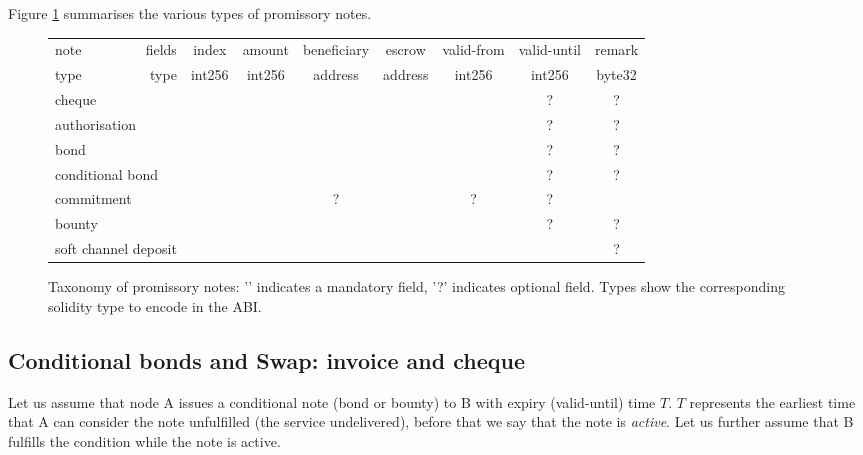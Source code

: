 Figure \ref{fig:taxonomy} summarises the various types of promissory notes.

\newcommand{\tick}{\checkmark}
\newcommand{\opt}{?}
\begin{center}
\begin{figure}
\begin{center}
\begin{tabular}{|l|r||c|c|c|c|c|c|c|}
\hline
note & fields
& index
& amount
& beneficiary
& escrow
& valid-from
& valid-until
& remark
\\
\cline{2-9}

type & type 
& int256
& int256
& address
& address
& int256
& int256
& byte32
\\
\hline
\hline
\multicolumn{2}{|l||}{cheque}   & \tick & \tick & \tick & & & \opt& \opt
\\
\multicolumn{2}{|l||}{authorisation} &  & \tick & \tick & & & \opt& \opt
\\
\multicolumn{2}{|l||}{bond} & \tick & \tick & \tick & & \tick & \opt& \opt
\\
\multicolumn{2}{|l||}{conditional bond} &  & \tick & \tick & \tick & \tick & \opt& \opt
\\
\multicolumn{2}{|l||}{commitment} &   & \tick & \opt &\tick &\opt &\opt& \tick
\\
\multicolumn{2}{|l||}{bounty} & \tick &  \tick & & \tick & \tick & \opt& \opt
\\
\multicolumn{2}{|l||}{soft channel deposit} &  \tick & \tick & & & && \opt
\\
\hline
\end{tabular}
\end{center}
\caption{Taxonomy of promissory notes: '\tick' indicates a mandatory field, '?' indicates optional field. Types show the corresponding solidity type to encode in the ABI. }
\label{fig:taxonomy}
\end{figure}
\end{center}

\subsection{Conditional bonds and Swap: invoice and cheque}

Let us assume that node A issues a conditional note (bond or bounty) to B with expiry (valid-until) time $T$. $ T$ represents the earliest time that A can consider the note unfulfilled (the service undelivered), before that we say that the note is \emph{active}. Let us further assume that B fulfills the condition while the note is active.

